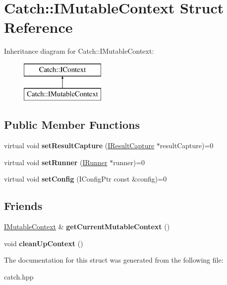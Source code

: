\hypertarget{structCatch_1_1IMutableContext}{}\section{Catch\+::I\+Mutable\+Context Struct Reference}
\label{structCatch_1_1IMutableContext}
Inheritance diagram for Catch\+::I\+Mutable\+Context\+:\begin{figure}[H]
\begin{center}
\leavevmode
\includegraphics[height=2.000000cm]{structCatch_1_1IMutableContext}
\end{center}
\end{figure}
\subsection*{Public Member Functions}
\begin{DoxyCompactItemize}
\item 
\mbox{\label{structCatch_1_1IMutableContext_a4a80afd0525b7def21bee8d9b48f2d39}} 
virtual void {\bfseries set\+Result\+Capture} (\mbox{\hyperlink{structCatch_1_1IResultCapture}{I\+Result\+Capture}} $\ast$result\+Capture)=0
\item 
\mbox{\label{structCatch_1_1IMutableContext_af2e53b1dea4527a2587cff266a730f6e}} 
virtual void {\bfseries set\+Runner} (\mbox{\hyperlink{structCatch_1_1IRunner}{I\+Runner}} $\ast$runner)=0
\item 
\mbox{\label{structCatch_1_1IMutableContext_aa81ba080fce084e9482f20338bc88531}} 
virtual void {\bfseries set\+Config} (I\+Config\+Ptr const \&config)=0
\end{DoxyCompactItemize}
\subsection*{Friends}
\begin{DoxyCompactItemize}
\item 
\mbox{\label{structCatch_1_1IMutableContext_aea4b25692aaf4397cdf630716976f6b8}} 
\mbox{\hyperlink{structCatch_1_1IMutableContext}{I\+Mutable\+Context}} \& {\bfseries get\+Current\+Mutable\+Context} ()
\item 
\mbox{\label{structCatch_1_1IMutableContext_ac07cdb7d744cc8f09672d924324b55fd}} 
void {\bfseries clean\+Up\+Context} ()
\end{DoxyCompactItemize}


The documentation for this struct was generated from the following file\+:\begin{DoxyCompactItemize}
\item 
catch.\+hpp\end{DoxyCompactItemize}
